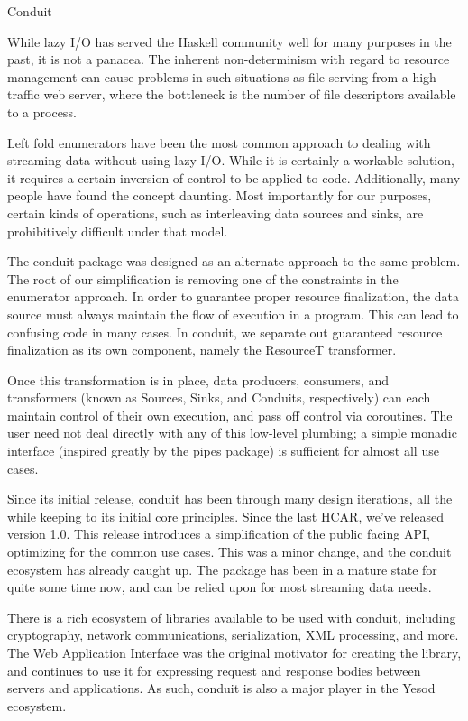 \begin{hcarentry}[updated]{Conduit}
\label{conduit}
\makeheader

While lazy I/O has served the Haskell community well for many purposes in the past, it is not a panacea. The inherent non-determinism with regard to resource management can cause problems in such situations as file serving from a high traffic web server, where the bottleneck is the number of file descriptors available to a process.

Left fold enumerators have been the most common approach to dealing with streaming data without using lazy I/O. While it is certainly a workable solution, it requires a certain inversion of control to be applied to code. Additionally, many people have found the concept daunting. Most importantly for our purposes, certain kinds of operations, such as interleaving data sources and sinks, are prohibitively difficult under that model.

The conduit package was designed as an alternate approach to the same problem. The root of our simplification is removing one of the constraints in the enumerator approach. In order to guarantee proper resource finalization, the data source must always maintain the flow of execution in a program. This can lead to confusing code in many cases. In conduit, we separate out guaranteed resource finalization as its own component, namely the ResourceT transformer.

Once this transformation is in place, data producers, consumers, and transformers (known as Sources, Sinks, and Conduits, respectively) can each maintain control of their own execution, and pass off control via coroutines. The user need not deal directly with any of this low-level plumbing; a simple monadic interface (inspired greatly by the pipes package) is sufficient for almost all use cases.

Since its initial release, conduit has been through many design iterations, all the while keeping to its initial core principles. Since the last HCAR, we've released version 1.0. This release introduces a simplification of the public facing API, optimizing for the common use cases. This was a minor change, and the conduit ecosystem has already caught up. The package has been in a mature state for quite some time now, and can be relied upon for most streaming data needs.

There is a rich ecosystem of libraries available to be used with conduit, including cryptography, network communications, serialization, XML processing, and more. The Web Application Interface was the original motivator for creating the library, and continues to use it for expressing request and response bodies between servers and applications. As such, conduit is also a major player in the Yesod ecosystem.


\end{hcarentry}
